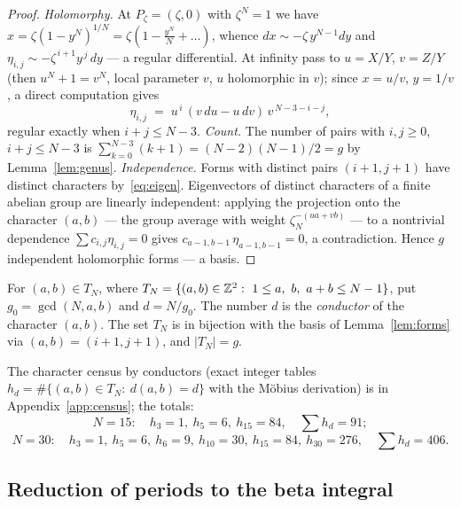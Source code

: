 \begin{proof}
\emph{Holomorphy.} At $P_\zeta=(\zeta,0)$ with $\zeta^N=1$ we have
$x=\zeta(1-y^N)^{1/N}=\zeta(1-\tfrac{y^N}{N}+\dots)$, whence
$dx\sim-\zeta\,y^{N-1}dy$ and
$\eta_{i,j}\sim-\zeta^{\,i+1}y^{\,j}\,dy$ --- a regular differential.
At infinity pass to $u=X/Y$, $v=Z/Y$ (then $u^N+1=v^N$, local
parameter $v$, $u$ holomorphic in $v$); since $x=u/v$, $y=1/v$, a
direct computation gives
\begin{equation}\label{eq:infinity}
  \eta_{i,j} \;=\; u^{\,i}\,(v\,du-u\,dv)\,v^{\,N-3-i-j},
\end{equation}
regular exactly when $i+j\le N-3$.
\emph{Count.} The number of pairs with $i,j\ge0$, $i+j\le N-3$ is
$\sum_{k=0}^{N-3}(k+1)=(N-2)(N-1)/2=g$ by Lemma~\ref{lem:genus}.
\emph{Independence.} Forms with distinct pairs $(i+1,j+1)$ have
distinct characters by~\eqref{eq:eigen}. Eigenvectors of distinct
characters of a finite abelian group are linearly independent:
applying the projection onto the character $(a,b)$ --- the group
average with weight $\zeta_N^{-(ua+vb)}$ --- to a nontrivial
dependence $\sum c_{i,j}\eta_{i,j}=0$ gives
$c_{a-1,b-1}\,\eta_{a-1,b-1}=0$, a contradiction. Hence $g$
independent holomorphic forms --- a basis.
\end{proof}

\begin{definition}[conductor]\label{def:conductor}
For $(a,b)\in T_N$, where
$T_N=\{(a,b)\in\ZZ^2:\ 1\le a,\ b,\ a+b\le N-1\}$, put
$g_0=\gcd(N,a,b)$ and $d=N/g_0$. The number $d$ is the
\emph{conductor} of the character $(a,b)$. The set $T_N$ is in
bijection with the basis of Lemma~\ref{lem:forms} via
$(a,b)=(i+1,j+1)$, and $|T_N|=g$.
\end{definition}

The character census by conductors (exact integer tables
$h_d=\#\{(a,b)\in T_N:\ d(a,b)=d\}$ with the M\"obius derivation) is
in Appendix~\ref{app:census}; the totals:
\[
  N=15:\quad h_3=1,\ h_5=6,\ h_{15}=84,\quad \textstyle\sum h_d=91;
\]
\[
  N=30:\quad h_3=1,\ h_5=6,\ h_6=9,\ h_{10}=30,\ h_{15}=84,\
  h_{30}=276,\quad \textstyle\sum h_d=406.
\]

\subsection{Reduction of periods to the beta integral}

